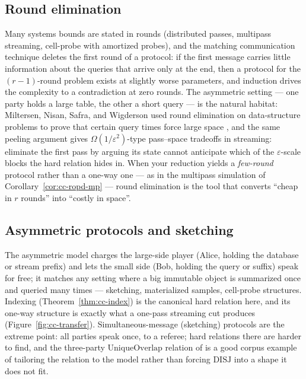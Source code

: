 \subsection{Round elimination}

Many systems bounds are stated in rounds (distributed passes, multipass streaming,
cell-probe with amortized probes), and the matching communication technique deletes
the first round of a protocol: if the first message carries little information about
the queries that arrive only at the end, then a protocol for the $(r-1)$-round
problem exists at slightly worse parameters, and induction drives the complexity to
a contradiction at zero rounds. The asymmetric setting --- one party holds a large
table, the other a short query --- is the natural habitat: Miltersen, Nisan, Safra,
and Wigderson used round elimination on data-structure problems to prove that
certain query times force large space \citep{communication-complexity-bg8}, and the
same peeling argument gives $\Omega(1/\varepsilon^2)$-type pass--space tradeoffs in
streaming: eliminate the first pass by arguing its state cannot anticipate which of
the $\varepsilon$-scale blocks the hard relation hides in. When your reduction
yields a \emph{few-round} protocol rather than a one-way one --- as in the multipass
simulation of Corollary~\ref{cor:cc-ropd-mp} --- round elimination is the tool that
converts ``cheap in $r$ rounds'' into ``costly in space''.

\subsection{Asymmetric protocols and sketching}

The asymmetric model charges the large-side player (Alice, holding the database or
stream prefix) and lets the small side (Bob, holding the query or suffix) speak for
free; it matches any setting where a big immutable object is summarized once and
queried many times --- sketching, materialized samples, cell-probe structures.
Indexing (Theorem~\ref{thm:cc-index}) is the canonical hard relation here, and its
one-way structure is exactly what a one-pass streaming cut produces
(Figure~\ref{fig:cc-transfer}). Simultaneous-message (sketching) protocols are the
extreme point: all parties speak once, to a referee; hard relations there are harder
to find, and the three-party $\mathrm{UniqueOverlap}$ relation of
\citep{sigmod26-070} is a good corpus example of tailoring the relation to the
model rather than forcing $\mathrm{DISJ}$ into a shape it does not fit.

